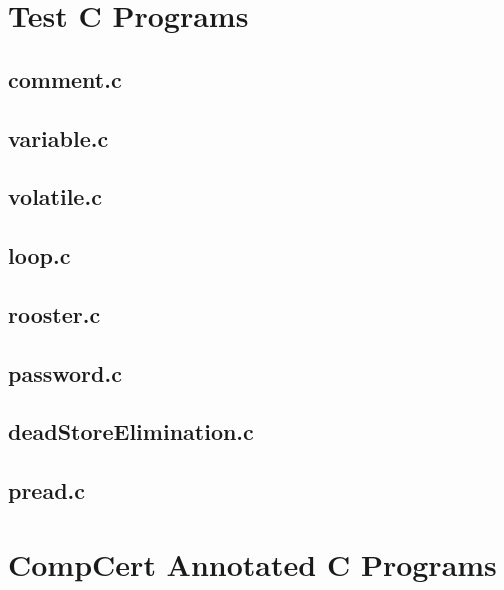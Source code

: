
\onecolumn
\begin{appendices}
\section{Test C Programs}
\label{app:testPrograms}

\subsection{comment.c}


\subsection{variable.c}


\subsection{volatile.c}


\subsection{loop.c}


\subsection{rooster.c}


\subsection{password.c}


\subsection{deadStoreElimination.c}


\subsection{pread.c}


\section{CompCert Annotated C Programs}
\label{app:compCertC}

\end{appendices}
